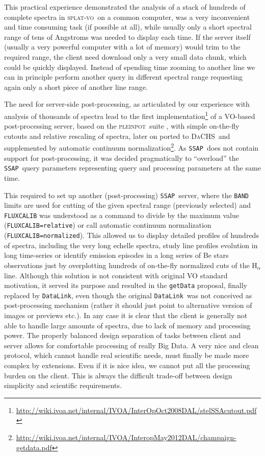 \documentclass[final,authoryear,5p,times,twocolumn]{elsarticle}
\newcommand{\datalink}{\texttt{DataLink}}
\newcommand{\ssap}{\texttt{SSAP}}
\newcommand{\splatvo}{\textsc{splat-vo}}
\newcommand{\dachs}{\textsc{DaCHS}}
\newcommand{\pleinpot}{\textsc{pleinpot}}
\begin{document}
This practical experience demonstrated the analysis of a stack of hundreds
of complete spectra in \splatvo\ on a common computer, was a very inconvenient and
time consuming task (if possible at all), while usually only a short spectral
range of tens of Angstroms was needed to display each time.  If the server
itself (usually a very powerful computer with a lot of memory) would trim to
the required range, the client need download only a very small data chunk,
which could be quickly displayed.  Instead of spending time zooming to another
line we can in principle perform another query in different spectral range
requesting again only a short piece of another line range.

The need for server-side post-processing, as articulated by our
experience with analysis of thousands of spectra lead to the first
implementation\footnote{\url{http://wiki.ivoa.net/internal/IVOA/InterOpOct2008DAL/stelSSAcutout.pdf}}
of a VO-based post-processing server, based on the \pleinpot\ suite
\citep{2005ASPC..347..385C}, with simple on-the-fly cutouts and
relative rescaling of spectra, later on ported to \dachs\ and
supplemented by automatic continuum
normalization\footnote{\url{http://wiki.ivoa.net/internal/IVOA/InteropMay2012DAL/champaign-getdata.pdf}}.
As \ssap\ does not contain support for post-processing, it was decided
pragmatically to ``overload'' the \ssap\ query parameters representing
query and processing parameters at the same time.

This required to set up another (post-processing) \ssap\ server, where
the \texttt{BAND} limits are used for cutting of the given spectral
range (previously selected) and \texttt{FLUXCALIB} was understood as a
command to divide by the maximum value (\texttt{FLUXCALIB=relative})
or call automatic continuum normalization
(\texttt{FLUXCALIB=normalized}).  This allowed us to display detailed
profiles of hundreds of spectra, including the very long echelle
spectra, study line profiles evolution in long time-series or identify
emission episodes in a long series of Be stars observations just by
overplotting hundreds of on-the-fly normalized cuts of the H$_\alpha$
line.  Although this solution is not consistent with original VO
standard motivation, it served its purpose and resulted in the
\texttt{getData} proposal, finally replaced by \datalink, even though
the original \datalink\ was not conceived as post-processing mechanism
(rather it should just point to alternative version of images or
previews etc.).  In any case it is clear that the client is generally
not able to handle large amounts of spectra, due to lack of memory and
processing power. The properly balanced design separation of tasks
between client and server allows for comfortable processing of really
Big Data.  A very nice and clean protocol, which cannot handle real
scientific needs, must finally be made more complex by
extensions. Even if it is nice idea, we cannot put all the processing
burden on the client.  This is always the difficult trade-off between
design simplicity and scientific requirements.
\end{document}
